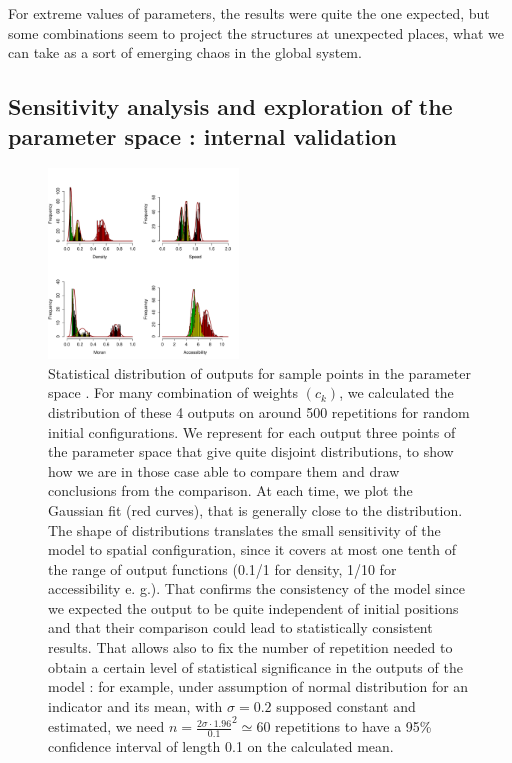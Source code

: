 \documentclass[a4paper,twocolumn,twoside,10pt]{article}
\begin{document}
For extreme values of parameters, the results were quite the one expected,
but some combinations seem to project the structures at unexpected
places, what we can take as a sort of emerging chaos in the global
system.


\subsection{Sensitivity analysis and exploration of the parameter
  space : internal validation}



\begin{figure}[htp]
\centering
\includegraphics[width=0.45\textwidth]{figures/manyConfs}
\caption{Statistical distribution of outputs
for sample points in the parameter space . For many
combination of weights $(c_{k})$, we calculated the distribution
of these 4 outputs on around 500 repetitions for random initial configurations.
We represent for each output three points of the parameter space that
give quite disjoint distributions, to show how we are in those case
able to compare them and draw conclusions from the comparison. At
each time, we plot the Gaussian fit (red curves), that is generally
close to the distribution. The shape of distributions translates the
small sensitivity of the model to spatial configuration, since it
covers at most one tenth of the range of output functions (0.1/1 for
density, 1/10 for accessibility e. g.). That confirms the consistency
of the model since we expected the output to be quite independent
of initial positions and that their comparison could lead to statistically
consistent results. That allows also to fix the number of repetition
needed to obtain a certain level of statistical significance in the
outputs of the model : for example, under assumption of normal
distribution for an indicator and its mean, with $\sigma = 0.2$ supposed constant and estimated, we need $n=\frac{2\sigma\cdot 1.96 }{0.1}^{2}\simeq60 $  repetitions to have a 95\% confidence interval of length 0.1 on the calculated mean.}

\label{fig4}

\end{figure}
\end{document}
